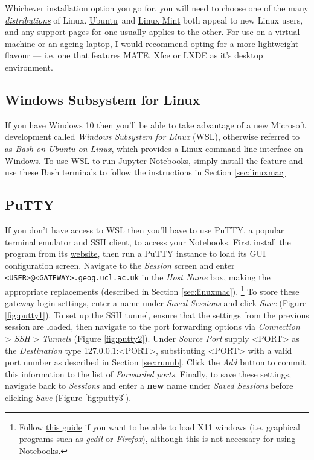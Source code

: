 \documentclass[a4paper]{article}
\begin{document}
Whichever installation option you go for, you will need to choose one of the many \emph{\href{http://distrowatch.com/dwres.php?resource=major}{distributions}} of Linux. \href{https://www.ubuntu.com/download}{Ubuntu}~and \href{https://linuxmint.com/}{Linux Mint} both appeal to new Linux users, and any support pages for one usually applies to the other.
For use on a virtual machine or an ageing laptop, I would recommend opting for a more lightweight flavour --- i.e. one that features MATE, Xfce or LXDE as it's desktop environment.

\subsection{Windows Subsystem for Linux}
\label{sec:wsl}
If you have Windows 10 then you'll be able to take advantage of a new Microsoft development called \emph{Windows Subsystem for Linux} (WSL), otherwise referred to as \emph{Bash on Ubuntu on Linux}, which provides a Linux command-line interface on Windows.
To use WSL to run Jupyter Notebooks, simply \href{https://msdn.microsoft.com/en-gb/commandline/wsl/install_guide}{install the feature} and use these Bash terminals to follow the instructions in Section \ref{sec:linuxmac}

\subsection{PuTTY}
\label{sec:putty}

If you don't have access to WSL then you'll have to use PuTTY, a popular terminal emulator and SSH client, to access your Notebooks. 
First install the program from its \href{http://www.chiark.greenend.org.uk/~sgtatham/putty/latest.html}{website}, then run a PuTTY instance to load its GUI configuration screen. 
Navigate to the \emph{Session} screen and enter \texttt{\textless{}USER\textgreater{}@\textless{}GATEWAY\textgreater{}.geog.ucl.ac.uk} in the \emph{Host Name} box, making the appropriate replacements (described in Section \ref{sec:linuxmac}).
\footnote{Follow \href{http://www.geo.mtu.edu/geoschem/docs/putty_install.html}{this guide} if you want to be able to load X11 windows (i.e. graphical programs such as \emph{gedit} or \emph{Firefox}), although this is not necessary for using Notebooks.}
To store these gateway login settings, enter a name under \emph{Saved Sessions} and click \emph{Save} (Figure \ref{fig:putty1}).
To set up the SSH tunnel, ensure that the settings from the previous session are loaded, then navigate to the port forwarding options via \emph{Connection} \textgreater{} \emph{SSH} \textgreater{} \emph{Tunnels} (Figure \ref{fig:putty2}). 
Under \emph{Source Port} supply \textless{}PORT\textgreater{} as the \emph{Destination} type 127.0.0.1:\textless{}PORT\textgreater{}, substituting \textless{}PORT\textgreater{} with a valid port number as described in Section \ref{sec:runnb}.
Click the \emph{Add} button to commit this information to the list of \emph{Forwarded ports}.
Finally, to save these settings, navigate back to \emph{Sessions} and enter a \textbf{new} name under \emph{Saved Sessions} before clicking \emph{Save} (Figure \ref{fig:putty3}).
\end{document}
